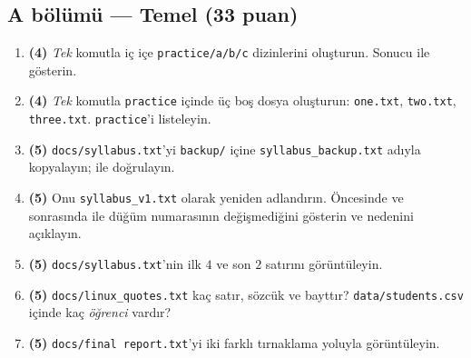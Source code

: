 \subsection*{A bölümü --- Temel (33 puan)}
\begin{enumerate}[leftmargin=2.2em,label=\textbf{\arabic*.}]
  \item \textbf{(4)} \emph{Tek} komutla iç içe \texttt{practice/a/b/c} dizinlerini oluşturun. Sonucu  ile gösterin.
  \item \textbf{(4)} \emph{Tek} komutla \texttt{practice} içinde üç boş dosya oluşturun: \texttt{one.txt}, \texttt{two.txt}, \texttt{three.txt}. \texttt{practice}'i listeleyin.
  \item \textbf{(5)} \texttt{docs/syllabus.txt}'yi \texttt{backup/} içine \texttt{syllabus\_backup.txt} adıyla kopyalayın;  ile doğrulayın.
  \item \textbf{(5)} Onu \texttt{syllabus\_v1.txt} olarak yeniden adlandırın. Öncesinde ve sonrasında  ile düğüm numarasının değişmediğini gösterin ve nedenini açıklayın.
  \item \textbf{(5)} \texttt{docs/syllabus.txt}'nin ilk $4$ ve son $2$ satırını görüntüleyin.
  \item \textbf{(5)} \texttt{docs/linux\_quotes.txt} kaç satır, sözcük ve bayttır? \texttt{data/students.csv} içinde kaç \emph{öğrenci} vardır?
  \item \textbf{(5)} \texttt{docs/final report.txt}'yi iki farklı tırnaklama yoluyla görüntüleyin.
\end{enumerate}

